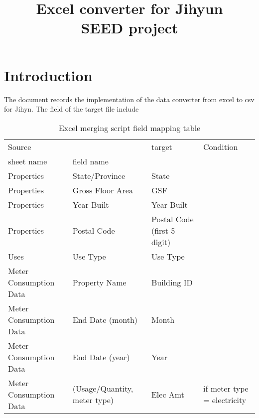 \documentclass[12pt]{article}
\begin{document}
\title{Excel converter for Jihyun\\
       \large SEED project}
\maketitle
\tableofcontents
\newpage
\section{Introduction}\label{sec:intro}
The document records the implementation of the data converter from excel to csv for Jihyn. The field of the target file include
\begin{table}[h!]
  \footnotesize
\centering
\caption{Excel merging script field mapping table}
\label{my-label}
\begin{tabular}{ll|l|l}
Source                 &                              & target                      & Condition                   \\
sheet name             & field name                   &                             &                             \\
  \hline
  \hline
Properties             & State/Province               & State                       &                             \\
Properties             & Gross Floor Area             & GSF                         &                             \\
Properties             & Year Built                   & Year Built                  &                             \\
Properties             & Postal Code                  & Postal Code (first 5 digit) &                           \\ 
  \hline
Uses                   & Use Type                     & Use Type                    &                             \\
  \hline
Meter Consumption Data & Property Name                & Building ID                 &                             \\
Meter Consumption Data & End Date (month)             & Month                       &                             \\
Meter Consumption Data & End Date (year)             & Year                        &                             \\
Meter Consumption Data & (Usage/Quantity, meter type) & Elec Amt                    & if meter type = electricity \\

\end{tabular}
\end{table}
\end{document}
